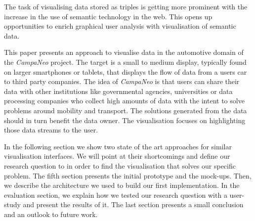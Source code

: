   The task of visualising data stored as triples is getting more prominent with the increase in the use of semantic technology in the web. This opens up opportunities to enrich graphical user analysis with visualisation of semantic data.
  
  This paper presents an approach to visualise data in the automotive domain of the \textit{CampaNeo} project. The target is a small to medium display, typically found on larger smartphones or tablets, that displays the flow of data from a users car to third party companies. The idea of \textit{CampaNeo} is that users can share their data with other institutions like governmental agencies, universities or data processing companies who collect high amounts of data with the intent to solve problems around mobility and transport. The solutions generated from the data should in turn benefit the data owner. The visualisation focuses on highlighting those data streams to the user.
  
  In the following section we show two state of the art approaches for similar visualisation interfaces. We will point at their shortcomings and define our research question to in order to find the visualisation that solves our specific problem. The fifth section presents the initial prototype and the mock-ups. Then, we describe the architecture we used to build our first implementation. In the evaluation section, we explain how we tested our research question with a user-study and present the results of it. The last section presents a small conclusion and an outlook to future work.
